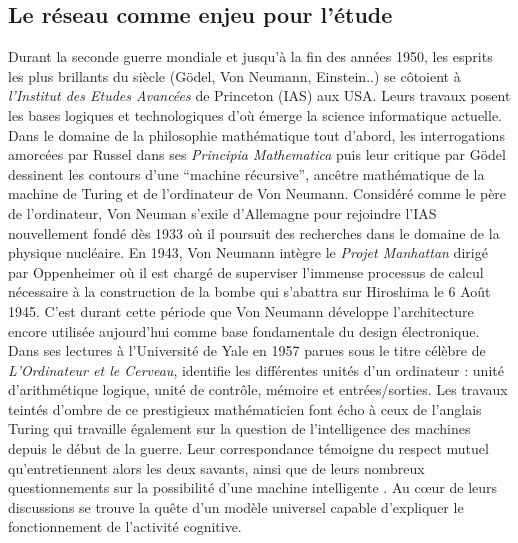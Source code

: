 \subsection[Le réseau comme enjeu pour l{\textquoteright}étude]{Le réseau comme enjeu pour l{\textquoteright}étude}
Durant la seconde guerre mondiale et jusqu{\textquoteright}à la fin des années 1950, les esprits les plus brillants du siècle (G\"odel, Von Neumann, Einstein..) se c\^otoient à \textit{l{\textquoteright}Institut des Etudes Avancées} de Princeton (IAS) aux USA. Leurs travaux posent les bases logiques et technologiques d{\textquoteright}o\`u émerge la science informatique actuelle. Dans le domaine de la philosophie mathématique tout d{\textquoteright}abord, les interrogations amorcées par Russel dans ses \textit{Principia Mathematica }puis leur critique par G\"odel dessinent les contours d{\textquoteright}une {\textquotedblleft}machine récursive{\textquotedblright}, anc\^etre mathématique de la machine de Turing et de l{\textquoteright}ordinateur de Von Neumann. Considéré comme le père de l{\textquoteright}ordinateur, Von Neuman s{\textquoteright}exile d{\textquoteright}Allemagne pour rejoindre l{\textquoteright}IAS nouvellement fondé dès 1933 o\`u il poursuit des recherches dans le domaine de la physique nucléaire. En 1943, Von Neumann intègre le \textit{Projet Manhattan} dirigé par Oppenheimer o\`u il est chargé de superviser l{\textquoteright}immense processus de calcul nécessaire à la construction de la bombe qui s{\textquoteright}abattra sur Hiroshima le 6 Ao\^ut 1945. C{\textquoteright}est durant cette période que Von Neumann développe l{\textquoteright}architecture encore utilisée aujourd{\textquoteright}hui comme base fondamentale du design électronique. Dans ses lectures à l{\textquoteright}Université de Yale en 1957 parues sous le titre célèbre de \textit{L{\textquoteright}Ordinateur et le Cerveau}, \cite{Neumann1958} identifie les différentes unités d{\textquoteright}un ordinateur : unité d{\textquoteright}arithmétique logique, unité de contr\^ole, mémoire et entrées/sorties. Les travaux teintés d{\textquoteright}ombre de ce prestigieux mathématicien font écho à ceux de l{\textquoteright}anglais Turing qui travaille également sur la question de l{\textquoteright}intelligence des machines depuis le début de la guerre. Leur correspondance témoigne du respect mutuel qu{\textquoteright}entretiennent alors les deux savants, ainsi que de leurs nombreux questionnements sur la possibilité d{\textquoteright}une machine intelligente \citep{Istrail2013}. Au c{\oe}ur de leurs discussions se trouve la qu\^ete d{\textquoteright}un modèle universel capable d{\textquoteright}expliquer le fonctionnement de l{\textquoteright}activité cognitive.  

